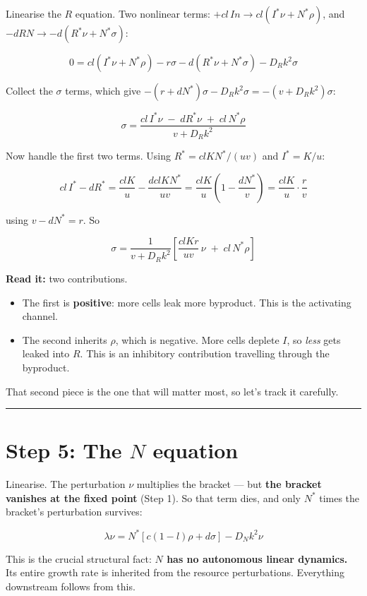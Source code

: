 \documentclass[11pt]{article}
\begin{document}
Linearise the $R$ equation. Two nonlinear terms: $+cl\, In \to cl(I^*\nu + N^*\rho)$, and $-d R N \to -d(R^*\nu + N^*\sigma)$:

\[
0 = cl\left(I^*\nu + N^*\rho\right) - r\sigma - d\left(R^*\nu + N^*\sigma\right) - D_R k^2 \sigma
\]

Collect the $\sigma$ terms, which give $-(r + d N^*)\sigma - D_R k^2\sigma = -(v + D_R k^2)\sigma$:

\[
\sigma = \frac{cl\, I^*\nu \;-\; d R^* \nu \;+\; cl\, N^*\rho}{v + D_R k^2}
\]

Now handle the first two terms. Using $R^* = clKN^*/(uv)$ and $I^*=K/u$:

\[
cl\,I^* - d R^* = \frac{clK}{u} - \frac{d clKN^*}{uv} = \frac{clK}{u}\left(1 - \frac{d N^*}{v}\right) = \frac{clK}{u}\cdot\frac{r}{v}
\]

using $v - d N^* = r$. So

\[
\boxed{\;\sigma = \frac{1}{v+D_R k^2}\left[\frac{clKr}{uv}\,\nu \;+\; cl\,N^*\rho\right]\;}
\]

\textbf{Read it:} two contributions.
\begin{itemize}
  \item The first is \textbf{positive}: more cells leak more byproduct. This is the activating channel.
  \item The second inherits $\rho$, which is negative. More cells deplete $I$, so \emph{less} gets leaked into $R$. This is an inhibitory contribution travelling through the byproduct.
\end{itemize}

That second piece is the one that will matter most, so let's track it carefully.

\bigskip\hrule\bigskip

\section*{Step 5: The $N$ equation}

Linearise. The perturbation $\nu$ multiplies the bracket --- but \textbf{the bracket vanishes at the fixed point} (Step 1). So that term dies, and only $N^*$ times the bracket's perturbation survives:

\[
\lambda\nu = N^*\left[c(1-l)\rho + d \sigma\right] - D_N k^2 \nu
\]

This is the crucial structural fact: \textbf{$N$ has no autonomous linear dynamics.} Its entire growth rate is inherited from the resource perturbations. Everything downstream follows from this.
\end{document}
